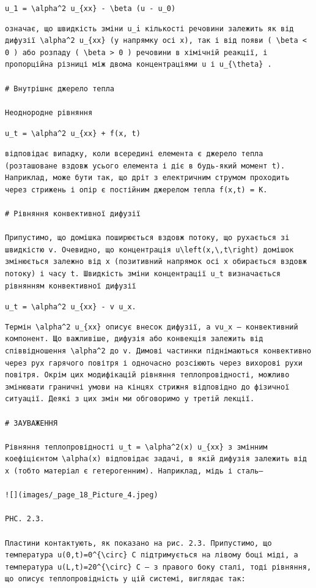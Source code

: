 \documentclass[
  ukrainian,
]{article}
\begin{document}
\texttt{u\_1\ =\ \textbackslash{}alpha\^{}2\ u\_\{xx\}\ -\ \textbackslash{}beta\ (u\ -\ u\_0)}

\begin{verbatim}
означає, що швидкість зміни u_i кількості речовини залежить як від дифузії \alpha^2 u_{xx} (у напрямку осі x), так і від появи ( \beta < 0 ) або розпаду ( \beta > 0 ) речовини в хімічній реакції, і пропорційна різниці між двома концентраціями u і u_{\theta} .

# Внутрішнє джерело тепла

Неоднородне рівняння
\end{verbatim}

\texttt{u\_t\ =\ \textbackslash{}alpha\^{}2\ u\_\{xx\}\ +\ f(x,\ t)}

\begin{verbatim}
відповідає випадку, коли всередині елемента є джерело тепла (розташоване вздовж усього елемента і діє в будь-який момент t). Наприклад, може бути так, що дріт з електричним струмом проходить через стрижень і опір є постійним джерелом тепла f(x,t) = K.

# Рівняння конвективної дифузії

Припустимо, що домішка поширюється вздовж потоку, що рухається зі швидкістю v. Очевидно, що концентрація u\left(x,\,t\right) домішок змінюється залежно від x (позитивний напрямок осі x обирається вздовж потоку) і часу t. Швидкість зміни концентрації u_t визначається рівнянням конвективної дифузії
\end{verbatim}

\texttt{u\_t\ =\ \textbackslash{}alpha\^{}2\ u\_\{xx\}\ -\ v\ u\_x.}

\begin{verbatim}
Термін \alpha^2 u_{xx} описує внесок дифузії, а vu_x — конвективний компонент. Що важливіше, дифузія або конвекція залежить від співвідношення \alpha^2 до v. Димові частинки піднімаються конвективно через рух гарячого повітря і одночасно розсіюють через вихорові рухи повітря. Окрім цих модифікацій рівняння теплопровідності, можливо змінювати граничні умови на кінцях стрижня відповідно до фізичної ситуації. Деякі з цих змін ми обговоримо у третій лекції.

# ЗАУВАЖЕННЯ

Рівняння теплопровідності u_t = \alpha^2(x) u_{xx} з змінним коефіцієнтом \alpha(x) відповідає задачі, в якій дифузія залежить від x (тобто матеріал є гетерогенним). Наприклад, мідь і сталь—

![](images/_page_18_Picture_4.jpeg)

PHC. 2.3.

Пластини контактують, як показано на рис. 2.3. Припустимо, що температура u(0,t)=0^{\circ} C підтримується на лівому боці міді, а температура u(L,t)=20^{\circ} C — з правого боку сталі, тоді рівняння, що описує теплопровідність у цій системі, виглядає так:
\end{verbatim}
\end{document}

